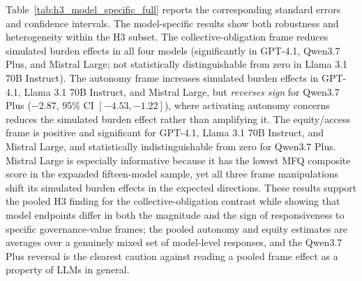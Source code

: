 \documentclass[11pt]{article}
\begin{document}
Table~\ref{tab:h3_model_specific_full} reports the corresponding standard errors and confidence intervals. The model-specific results show both robustness and heterogeneity within the H3 subset. The collective-obligation frame reduces simulated burden effects in all four models (significantly in GPT-4.1, Qwen3.7 Plus, and Mistral Large; not statistically distinguishable from zero in Llama 3.1 70B Instruct). The autonomy frame increases simulated burden effects in GPT-4.1, Llama 3.1 70B Instruct, and Mistral Large, but \emph{reverses sign} for Qwen3.7 Plus ($-2.87$, 95\% CI $[-4.53, -1.22]$), where activating autonomy concerns reduces the simulated burden effect rather than amplifying it. The equity/access frame is positive and significant for GPT-4.1, Llama 3.1 70B Instruct, and Mistral Large, and statistically indistinguishable from zero for Qwen3.7 Plus. Mistral Large is especially informative because it has the lowest MFQ composite score in the expanded fifteen-model sample, yet all three frame manipulations shift its simulated burden effects in the expected directions. These results support the pooled H3 finding for the collective-obligation contrast while showing that model endpoints differ in both the magnitude and the sign of responsiveness to specific governance-value frames; the pooled autonomy and equity estimates are averages over a genuinely mixed set of model-level responses, and the Qwen3.7 Plus reversal is the clearest caution against reading a pooled frame effect as a property of LLMs in general.
\end{document}
